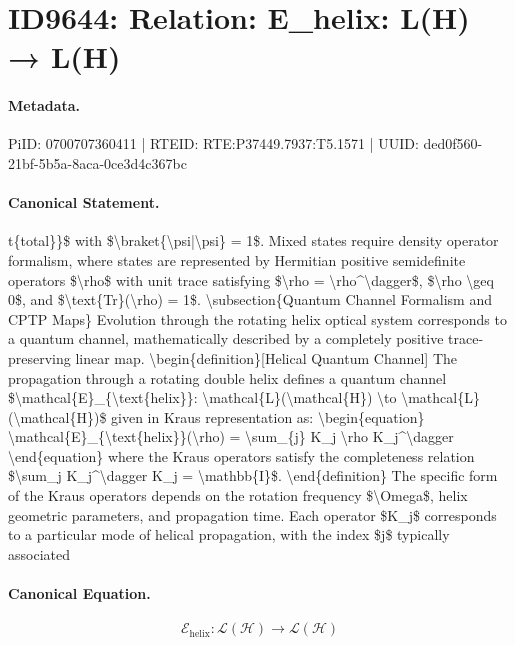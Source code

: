 \section*{ID9644: Relation: E\_helix: L(H) → L(H)}
\paragraph{Metadata.}
PiID: 0700707360411 | RTEID: RTE:P37449.7937:T5.1571 | UUID: ded0f560-21bf-5b5a-8aca-0ce3d4c367bc

\paragraph{Canonical Statement.}
t\{total\}\}\$ with \$\textbackslash{}braket\{\textbackslash{}psi|\textbackslash{}psi\} = 1\$. Mixed states require density operator formalism, where states are represented by Hermitian positive semidefinite operators \$\textbackslash{}rho\$ with unit trace satisfying \$\textbackslash{}rho = \textbackslash{}rho\textasciicircum{}\textbackslash{}dagger\$, \$\textbackslash{}rho \textbackslash{}geq 0\$, and \$\textbackslash{}text\{Tr\}(\textbackslash{}rho) = 1\$. \textbackslash{}subsection\{Quantum Channel Formalism and CPTP Maps\} Evolution through the rotating helix optical system corresponds to a quantum channel, mathematically described by a completely positive trace-preserving linear map. \textbackslash{}begin\{definition\}[Helical Quantum Channel] The propagation through a rotating double helix defines a quantum channel \$\textbackslash{}mathcal\{E\}\_\{\textbackslash{}text\{helix\}\}: \textbackslash{}mathcal\{L\}(\textbackslash{}mathcal\{H\}) \textbackslash{}to \textbackslash{}mathcal\{L\}(\textbackslash{}mathcal\{H\})\$ given in Kraus representation as: \textbackslash{}begin\{equation\} \textbackslash{}mathcal\{E\}\_\{\textbackslash{}text\{helix\}\}(\textbackslash{}rho) = \textbackslash{}sum\_\{j\} K\_j \textbackslash{}rho K\_j\textasciicircum{}\textbackslash{}dagger \textbackslash{}end\{equation\} where the Kraus operators satisfy the completeness relation \$\textbackslash{}sum\_j K\_j\textasciicircum{}\textbackslash{}dagger K\_j = \textbackslash{}mathbb\{I\}\$. \textbackslash{}end\{definition\} The specific form of the Kraus operators depends on the rotation frequency \$\textbackslash{}Omega\$, helix geometric parameters, and propagation time. Each operator \$K\_j\$ corresponds to a particular mode of helical propagation, with the index \$j\$ typically associated

\paragraph{Canonical Equation.}
\[
\mathcal{E}_{\text{helix}}: \mathcal{L}(\mathcal{H}) \to \mathcal{L}(\mathcal{H})
\]

